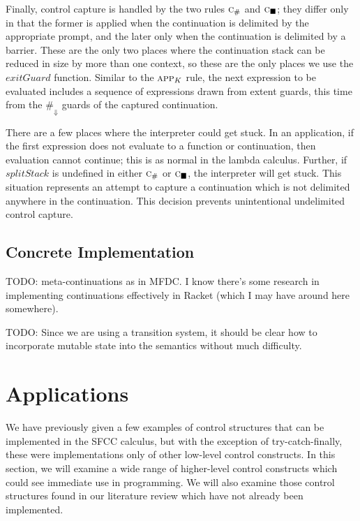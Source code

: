 \documentclass[11pt]{article}
\newcommand{\maybePage}{\newpage}
\begin{document}
Finally, control capture is handled by the two rules $\textsc{c}_\#$ and $\textsc{c}_\blacksquare$;
they differ only in that the former is applied when the continuation is delimited by the appropriate prompt, and the later only when the continuation is delimited by a barrier.
These are the only two places where the continuation stack can be reduced in size by more than one context, so these are the only places we use the $exitGuard$ function.
Similar to the $\textsc{app}_K$ rule, the next expression to be evaluated includes a sequence of expressions drawn from extent guards, this time from the $\#_\Downarrow$ guards of the captured continuation.


There are a few places where the interpreter could get stuck.
In an application, if the first expression does not evaluate to a function or continuation, then evaluation cannot continue; this is as normal in the lambda calculus.
Further, if $splitStack$ is undefined in either $\textsc{c}_\#$ or $\textsc{c}_\blacksquare$, the interpreter will get stuck.
This situation represents an attempt to capture a continuation which is not delimited anywhere in the continuation.
This decision prevents unintentional undelimited control capture.

\maybePage
\subsection{Concrete Implementation}

TODO: meta-continuations as in MFDC. I know there's some research in implementing continuations effectively in Racket (which I may have around here somewhere).

TODO: Since we are using a transition system, it should be clear how to incorporate mutable state into the semantics without much difficulty.






\maybePage
\section{Applications}
\label{sec:applications}

We have previously given a few examples of control structures that can be implemented in the SFCC calculus, but with the exception of try-catch-finally, these were implementations only of other low-level control constructs.
In this section, we will examine a wide range of higher-level control constructs which could see immediate use in programming.
We will also examine those control structures found in our literature review which have not already been implemented.
\end{document}

